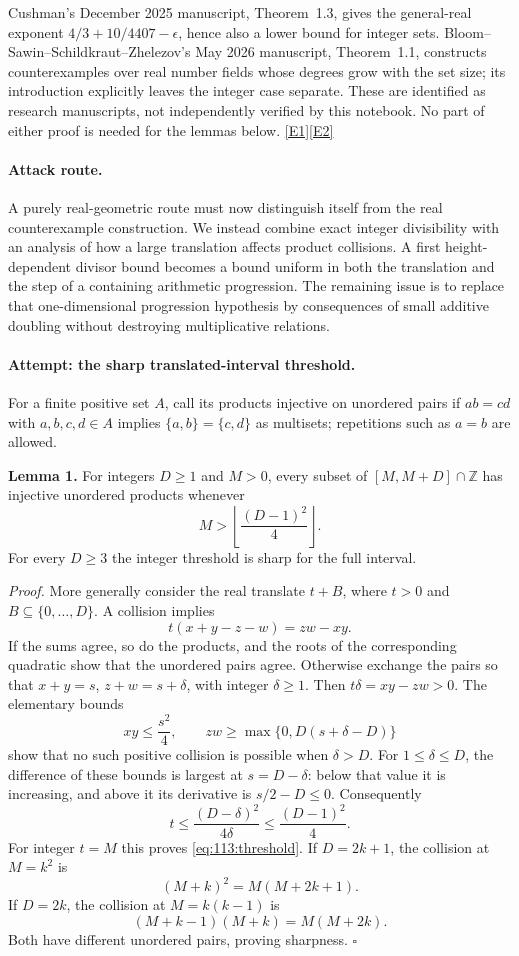\documentclass[11pt,a4paper]{article}
\newcommand{\Z}{\mathbb{Z}}
\newcommand{\eref}[2]{\hyperlink{extra:#1:#2}{[E#2]}}
\numberwithin{equation}{section}
\begin{document}
Cushman's December 2025 manuscript, Theorem~1.3, gives the general-real
exponent $4/3+10/4407-\epsilon$, hence also a lower bound for integer sets.
Bloom--Sawin--Schildkraut--Zhelezov's May 2026 manuscript, Theorem~1.1,
constructs counterexamples over real number fields whose degrees grow
with the set size; its introduction explicitly leaves the integer case
separate. These are identified as research manuscripts, not independently
verified by this notebook. No part of either proof is needed for the
lemmas below. \eref{113}{1}\eref{113}{2}

\paragraph{Attack route.}
A purely real-geometric route must now distinguish itself from the real
counterexample construction. We instead combine exact integer divisibility
with an analysis of how a large translation affects product collisions.
A first height-dependent divisor bound becomes a bound uniform in both
the translation and the step of a containing arithmetic progression.
The remaining issue is to replace that one-dimensional progression
hypothesis by consequences of small additive doubling without destroying
multiplicative relations.

\paragraph{Attempt: the sharp translated-interval threshold.}
For a finite positive set $A$, call its products injective on unordered
pairs if $ab=cd$ with $a,b,c,d\in A$ implies $\{a,b\}=\{c,d\}$ as
multisets; repetitions such as $a=b$ are allowed.

\textbf{Lemma 1.} For integers $D\geq1$ and $M>0$, every subset of
$[M,M+D]\cap\Z$ has injective unordered products whenever
\begin{equation}\label{eq:113:threshold}
 M>\left\lfloor\frac{(D-1)^2}{4}\right\rfloor.
\end{equation}
For every $D\geq3$ the integer threshold is sharp for the full interval.

\emph{Proof.} More generally consider the real translate
$t+B$, where $t>0$ and $B\subseteq\{0,\ldots,D\}$. A collision implies
\[
 t(x+y-z-w)=zw-xy.
\]
If the sums agree, so do the products, and the roots of the corresponding
quadratic show that the unordered pairs agree. Otherwise exchange the
pairs so that $x+y=s$, $z+w=s+\delta$, with integer $\delta\geq1$.
Then $t\delta=xy-zw>0$. The elementary bounds
\[
 xy\leq\frac{s^2}{4},\qquad
 zw\geq\max\{0,D(s+\delta-D)\}
\]
show that no such positive collision is possible when $\delta>D$.
For $1\leq\delta\leq D$, the difference of these bounds is largest at
$s=D-\delta$: below that value it is increasing, and above it its
derivative is $s/2-D\leq0$. Consequently
\[
 t\leq\frac{(D-\delta)^2}{4\delta}
 \leq\frac{(D-1)^2}{4}.
\]
For integer $t=M$ this proves \eqref{eq:113:threshold}.
If $D=2k+1$, the collision at $M=k^2$ is
\[
 (M+k)^2=M(M+2k+1).
\]
If $D=2k$, the collision at $M=k(k-1)$ is
\[
 (M+k-1)(M+k)=M(M+2k).
\]
Both have different unordered pairs, proving sharpness. $\square$
\end{document}
